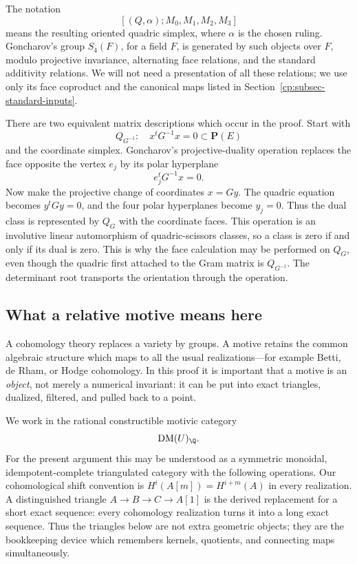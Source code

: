 The notation
\[
 [(Q,\alpha);M_0,M_1,M_2,M_3]
\]
means the resulting oriented quadric simplex, where \(\alpha\) is the chosen
ruling.  Goncharov's group \(S_4(F)\), for a field \(F\), is generated by
such objects over \(F\), modulo projective invariance, alternating face
relations, and the standard additivity relations.  We will not need a
presentation of all these relations; we use only its face coproduct and the
canonical maps listed in Section~\ref{cp:subsec-standard-inputs}.

There are two equivalent matrix descriptions which occur in the proof.
Start with
\[
 Q_{G^{-1}}:\quad x^tG^{-1}x=0\subset\mathbf P(E)
\]
and the coordinate simplex.  Goncharov's projective-duality operation
replaces the face opposite the vertex \(e_j\) by its polar hyperplane
\[
 e_j^tG^{-1}x=0.
\]
Now make the projective change of coordinates \(x=Gy\).  The quadric equation
becomes \(y^tGy=0\), and the four polar hyperplanes become \(y_j=0\).
Thus the dual class is represented by \(Q_G\) with the coordinate faces.
This operation is an involutive linear automorphism of quadric-scissors
classes, so a class is zero if and only if its dual is zero.  This is why the
face calculation may be performed on \(Q_G\), even though the quadric first
attached to the Gram matrix is \(Q_{G^{-1}}\).  The determinant root
transports the orientation through the operation.

\subsection{What a relative motive means here}
\label{cp:subsec-what-is-a-motive}

A cohomology theory replaces a variety by groups.  A motive retains the
common algebraic structure which maps to all the usual realizations---for
example Betti, de Rham, or Hodge cohomology.  In this proof it is important
that a motive is an \emph{object}, not merely a numerical invariant: it can
be put into exact triangles, dualized, filtered, and pulled back to a point.

We work in the rational constructible motivic category
\[
 \operatorname{DM}(U)_\Q.
\]
For the present argument this may be understood as a symmetric monoidal,
idempotent-complete triangulated category with the following operations.
Our cohomological shift convention is
\(H^i(A[m])=H^{i+m}(A)\) in every realization.  A distinguished triangle
\(A\to B\to C\to A[1]\) is the derived replacement for a short exact
sequence: every cohomology realization turns it into a long exact
sequence.  Thus the triangles below are not extra geometric objects; they
are the bookkeeping device which remembers kernels, quotients, and
connecting maps simultaneously.

